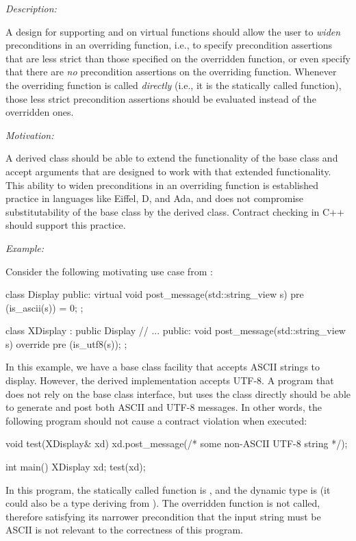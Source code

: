 \emph{Description:}

A design for supporting  and  on virtual functions should allow the user to \emph{widen} preconditions in an overriding function, i.e., to specify precondition assertions that are less strict than those specified on the overridden function, or even specify that there are \emph{no} precondition assertions on the overriding function. Whenever the overriding function is called \emph{directly} (i.e., it is the statically called function), those less strict precondition assertions should be evaluated instead of the overridden ones.

\emph{Motivation:}

A derived class should be able to extend the functionality of the base class and accept arguments that are designed to work with that extended functionality. This ability to widen preconditions in an overriding function is established practice in languages like Eiffel, D, and Ada, and does not compromise substitutability of the base class by the derived class. Contract checking in C++ should support this practice.

\emph{Example:}

Consider the following motivating use case from \cite{P0247R0}:
\begin{codeblock}
class Display {
public:
  virtual void post_message(std::string_view s)
     pre (is_ascii(s)) = 0;
};

class XDisplay : public Display {
   // ...
public:
  void post_message(std::string_view s) override
    pre (is_utf8(s));
 };
\end{codeblock}
In this example, we have a base class facility that accepts ASCII strings to display. However, the derived implementation accepts UTF-8. A program that does not rely on the  base class interface, but uses the  class directly should be able to generate and post both ASCII and UTF-8 messages. In other words, the following program should not cause a contract violation when executed:
\begin{codeblock}
void test(XDisplay& xd) {
  xd.post_message(/* some non-ASCII UTF-8 string */);
}

int main() {
  XDisplay xd;
  test(xd);
}
\end{codeblock}
In this program, the statically called function is , and the dynamic type is  (it could also be a type deriving from ). The overridden function  is not called, therefore satisfying its narrower precondition that the input string must be ASCII is not relevant to the correctness of this program.

